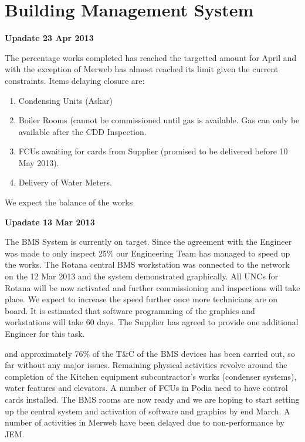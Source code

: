 \chapter{Building Management System}
\label{bms}

\begin{update}
\centerline{\textbf{Upadate 23 Apr 2013}}

The percentage works completed has reached the targetted amount for April and with the exception
of Merweb has almost reached its limit given the current constraints. Items delaying
closure are:

\begin{enumerate}
\item Condensing Units (Askar)
\item Boiler Rooms (cannot be commissioned until gas is available. Gas can only be available after the CDD Inspection.
\item FCUs awaiting for cards from Supplier (promised to be delivered before 10 May 2013).
\item Delivery of Water Meters.
\end{enumerate}

We expect the balance of the works 
\end{update}


\begin{update}
\centerline{\textbf{Upadate 13 Mar 2013}}
The BMS System is currently on target. Since the agreement with the Engineer was made to only
inspect 25\% our Engineering Team has managed to speed up the works. The Rotana central
BMS workstation was connected to the network on the 12 Mar 2013 and the system demonstrated
graphically. All UNCs for Rotana will be now activated and further commissioning and inspections will
take place. We expect to increase the speed further once more technicians are on board. It is estimated
that software programming of the graphics and workstations will take 60 days. The Supplier has 
agreed to provide one additional Engineer for this task.
\end{update}

 and approximately 76\% of the T\&C of the \ac{BMS} devices has been carried out, so far without any major issues. Remaining physical activities revolve around the
completion of the Kitchen equipment subcontractor's works (condenser systems), water features and elevators. A number of \acp{FCU} in Podia need to have control cards installed. The BMS rooms are now ready and we are hoping to start setting up the central system and activation of software and graphics by end March. A number of activities in Merweb have been delayed due to non-performance by JEM.

